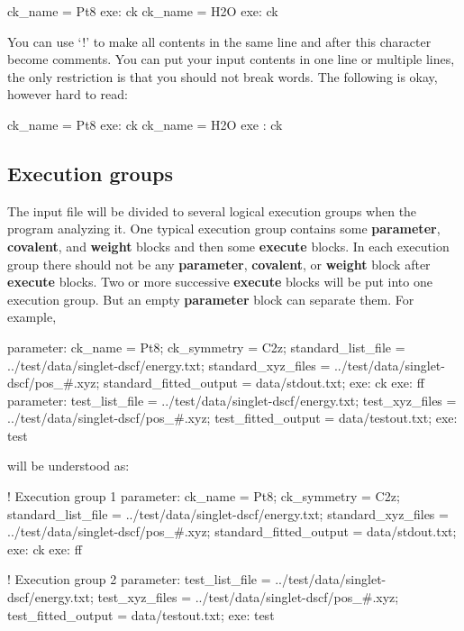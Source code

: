 \documentclass[11pt]{book}
\begin{document}
\begin{everbatim}
ck_name = Pt8
{ exe: ck }
ck_name = H2O
{ exe: ck }
\end{everbatim}

You can use `!' to make all contents in the same line and after this character become comments. You can put your
input contents in one line or multiple lines, the only restriction is that you should not break words. The 
following is okay, however hard to read:

\begin{everbatim}
ck_name =
Pt8
{ exe: ck }
ck_name
=
H2O
{ 
exe
:
ck }
\end{everbatim}

\subsection{Execution groups}

The input file will be divided to several logical execution groups when the program analyzing it. 
One typical execution group contains some \textbf{parameter}, \textbf{covalent}, and 
\textbf{weight} blocks and then some \textbf{execute} blocks. 
In each execution group there should not be any \textbf{parameter}, \textbf{covalent}, 
or \textbf{weight} block after \textbf{execute} blocks. Two or more successive \textbf{execute} blocks
will be put into one execution group. But an empty \textbf{parameter} block can separate them. For example, 

\begin{everbatim}
{ parameter:
 ck_name = Pt8;
 ck_symmetry = C2z;
 standard_list_file     = ../test/data/singlet-dscf/energy.txt;
 standard_xyz_files     = ../test/data/singlet-dscf/pos_#.xyz;
 standard_fitted_output = data/stdout.txt;
}
{ exe: ck }
{ exe: ff }
{ parameter:
 test_list_file     = ../test/data/singlet-dscf/energy.txt;
 test_xyz_files     = ../test/data/singlet-dscf/pos_#.xyz;
 test_fitted_output = data/testout.txt;
}
{exe: test }
\end{everbatim}

will be understood as:

\begin{everbatim}

! Execution group 1
  { parameter:
   ck_name = Pt8;
   ck_symmetry = C2z;
   standard_list_file     = ../test/data/singlet-dscf/energy.txt;
   standard_xyz_files     = ../test/data/singlet-dscf/pos_#.xyz;
   standard_fitted_output = data/stdout.txt;
  }
  { exe: ck }
  { exe: ff }

! Execution group 2
  { parameter:
   test_list_file     = ../test/data/singlet-dscf/energy.txt;
   test_xyz_files     = ../test/data/singlet-dscf/pos_#.xyz;
   test_fitted_output = data/testout.txt;
  }
  {exe: test }
\end{everbatim}
\end{document}
